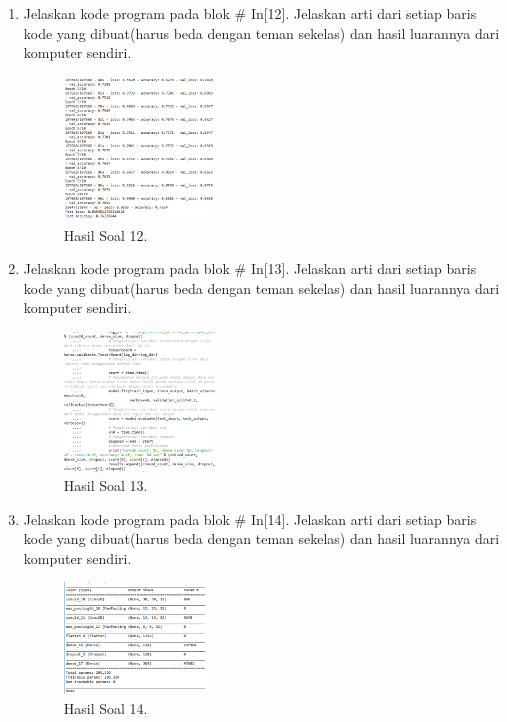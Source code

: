 \begin{enumerate}
    \item Jelaskan kode program pada blok \# In[12]. Jelaskan arti dari setiap baris kode yang dibuat(harus beda dengan teman sekelas) dan hasil luarannya dari komputer sendiri.
    \hfill\break
    
    \begin{figure}[H]
        \centering
            \includegraphics[width=4cm]{figures/1174077/7/praktek_12.PNG}
            \caption{Hasil Soal 12.}
        \end{figure}
        
    \item Jelaskan kode program pada blok \# In[13]. Jelaskan arti dari setiap baris kode yang dibuat(harus beda dengan teman sekelas) dan hasil luarannya dari komputer sendiri.
    \hfill\break
    
    \begin{figure}[H]
        \centering
            \includegraphics[width=4cm]{figures/1174077/7/praktek_13.PNG}
            \caption{Hasil Soal 13.}
        \end{figure}
        
    \item Jelaskan kode program pada blok \# In[14]. Jelaskan arti dari setiap baris kode yang dibuat(harus beda dengan teman sekelas) dan hasil luarannya dari komputer sendiri.
    \hfill\break
    
    \begin{figure}[H]
        \centering
            \includegraphics[width=4cm]{figures/1174077/7/praktek_14.PNG}
            \caption{Hasil Soal 14.}
        \end{figure}
        

\end{enumerate}
